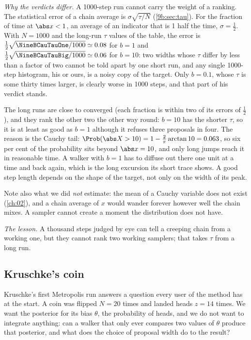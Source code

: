 \emph{Why the verdicts differ.} A 1000-step run cannot carry the weight of a ranking. The
statistical error of a chain average is $\sigma\sqrt{\tau/N}$ (\cref{9b:sec:tau}). For the
fraction of time at $\abs x<1$, an average of an indicator that is 1 half the time, $\sigma=\tfrac12$.
With $N=1000$ and the long-run $\tau$ values of the table, the error is
$\tfrac12\sqrt{\NineBCauTauOne/1000}\simeq0.08$ for $b=1$ and
$\tfrac12\sqrt{\NineBCauTauBig/1000}\simeq0.06$ for $b=10$: two widths whose $\tau$ differ by
less than a factor of two cannot be told apart by one short run, and any single 1000-step
histogram, his or ours, is a noisy copy of the target. Only $b=0.1$, whose $\tau$ is some thirty
times larger, is clearly worse in 1000 steps, and that part of his verdict stands.

The long runs are close to converged (each fraction is within two of its errors of $\tfrac12$), and they rank the
other two the other way round: $b=10$ has the shorter $\tau$, so it is at least as good as $b=1$
although it refuses three proposals in four. The reason is the Cauchy tail:
$\Prob(\abs X>10)=1-\tfrac2\pi\arctan10=0.063$, so six per cent of the probability sits beyond
$\abs x=10$, and only long jumps reach it in reasonable time. A walker with $b=1$ has to diffuse
out there one unit at a time and back again, which is the long excursion its short trace shows.
A good step length depends on the shape of the target, not only on the width of its peak.

Note also what we did \emph{not} estimate: the mean of a Cauchy variable does not exist
(\cref{ch:02}), and a chain average of $x$ would wander forever however well the chain mixes. A
sampler cannot create a moment the distribution does not have.

\emph{The lesson.} A thousand steps judged by eye can tell a creeping chain from a working one,
but they cannot rank two working samplers; that takes $\tau$ from a long run.

\subsection{Kruschke's coin}
\label{9b:sec:kruschke-coin}

Kruschke's first Metropolis run  answers a question every
user of the method has at the start. A coin was flipped $N=20$ times and landed heads $z=14$
times. We want the posterior for its bias $\theta$, the probability of heads, and we do not want
to integrate anything: can a walker that only ever compares two values of $\theta$ produce that
posterior, and what does the choice of proposal width do to the result?

